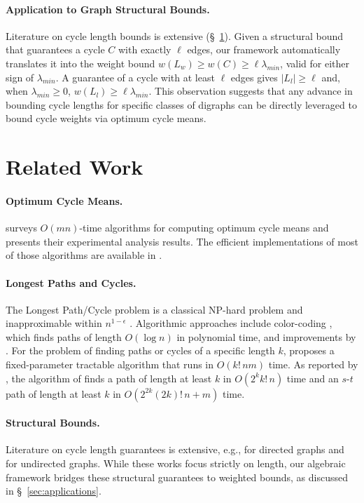 \documentclass{article}
\theoremstyle{definition}
\begin{document}
\paragraph{Application to Graph Structural Bounds.}
Literature on cycle length bounds is extensive
(\S~\ref{sec:related-work}). Given a structural bound that guarantees
a cycle $C$ with exactly $\ell$ edges, our framework automatically
translates it into the weight bound $w(L_w) \geq w(C) \geq \ell
\lambda_{min}$, valid for either sign of $\lambda_{min}$. A guarantee
of a cycle with at least $\ell$ edges gives $|L_l| \geq \ell$ and, when
$\lambda_{min} \geq 0$, $w(L_l) \geq \ell \lambda_{min}$. This
observation suggests that any advance in bounding cycle lengths for
specific classes of digraphs can be directly leveraged to bound cycle
weights via optimum cycle means.

\section{Related Work}
\label{sec:related-work}

\paragraph{Optimum Cycle Means.}
\citet{Da04} surveys $O(mn)$-time algorithms for computing optimum
cycle means and presents their experimental analysis results. The
efficient implementations of most of those algorithms are available in
\citep{Da15}.

\paragraph{Longest Paths and Cycles.}
The Longest Path/Cycle problem is a classical NP-hard problem
\citep{Ga79} and inapproximable within $n^{1-\epsilon}$
\citep{BjHuKh04}. Algorithmic approaches include color-coding
\citep{AlYuZw94}, which finds paths of length $O(\log n)$ in
polynomial time, and improvements by \citet{BjHu03}. For the problem
of finding paths or cycles of a specific length $k$, \citet{Mo85}
proposes a fixed-parameter tractable algorithm that runs in
$O(k!\,nm)$ time. As reported by \citet{HaLeCo24}, the algorithm of
\citet{Bo93} finds a path of length at least $k$ in $O(2^k k!\,n)$
time and an $s$-$t$ path of length at least $k$ in $O(2^{2k}(2k)!\,n +
m)$ time.

\paragraph{Structural Bounds.}
Literature on cycle length guarantees is extensive, e.g.,
\citet{ChZh88,Gh60,Th81} for directed graphs and
\citep{ErGa59,Di52,JaKrSo19,An22,FoGoSa24b} for undirected
graphs. While these works focus strictly on length, our algebraic
framework bridges these structural guarantees to weighted bounds, as
discussed in \S~\ref{sec:applications}.
\end{document}
